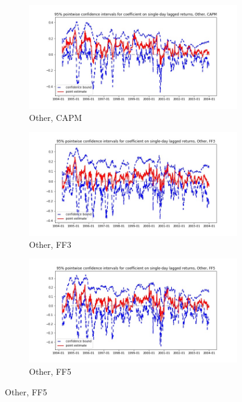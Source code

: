 \documentclass{article}
\begin{document}
\begin{landscape}
  \newpage
  
 \begin{figure}
  \centering
  \begin{subfigure}[b]{0.4\paperwidth}
    \centering
    \includegraphics[width=\textwidth]{Other/bwunif_pointwiseCIs_CAPM.jpg}
    \caption{Other, CAPM}
    \label{fig:1}
  \end{subfigure}
  \begin{subfigure}[b]{0.4\paperwidth}
    \centering
    \includegraphics[width=\textwidth]{Other/bwunif_pointwiseCIs_FF3.jpg}
    \caption{Other, FF3}
    \label{fig:2}
  \end{subfigure}
    \begin{subfigure}[b]{0.4\paperwidth}
    \centering
    \includegraphics[width=\textwidth]{Other/bwunif_pointwiseCIs_FF5.jpg}
    \caption{Other, FF5}
    \label{fig:1}
  \end{subfigure}
  \end{figure}
        
  \end{landscape}
  
\end{document}
